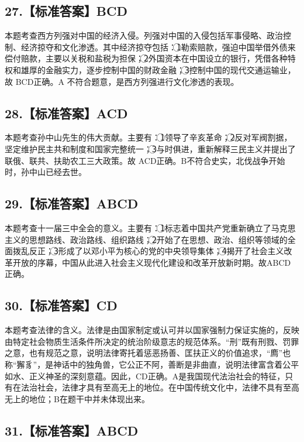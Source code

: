 \documentclass[UTF8,11pt]{ctexart}
\begin{document}
\subsection*{27.【标准答案】BCD}

本题考查西方列强对中国的经济入侵。列强对中国的入侵包括军事侵略、政治控制、经济掠夺和文化渗透。其中经济掠夺包括：\textcircled{1}勒索赔款，强迫中国举借外债来偿付赔款，主要以关税和盐税为担保；\textcircled{2}外国资本在中国设立的银行，凭借各种特权和雄厚的金融实力，逐步控制中国的财政金融；\textcircled{3}控制中国的现代交通运输业，故 BCD正确。A 不符合题意，是西方列强进行文化渗透的表现。


\subsection*{28.【标准答案】ACD}

本题考查孙中山先生的伟大贡献。主要有：\textcircled{1}领导了辛亥革命；\textcircled{2}反对军阀割据，坚定维护民主共和制度和国家完整统一；\textcircled{3}与时俱进，重新解释三民主义并提出了联俄、联共、扶助农工三大政策。故 ACD正确。B不符合史实，北伐战争开始时，孙中山已经去世。


\subsection*{29.【标准答案】ABCD}

本题考查十一届三中全会的意义。主要有：\textcircled{1}标志着中国共产党重新确立了马克思主义的思想路线、政治路线、组织路线；\textcircled{2}开始了在思想、政治、组织等领域的全面拨乱反正；\textcircled{3}形成了以邓小平为核心的党的中央领导集体；\textcircled{4}揭开了社会主义改革开放的序幕，中国从此进入社会主义现代化建设和改革开放新时期。故ABCD 正确。


\subsection*{30.【标准答案】CD}

本题考查法律的含义。法律是由国家制定或认可并以国家强制力保证实施的，反映由特定社会物质生活条件所决定的统治阶级意志的规范体系。“刑”既有刑戮、罚罪之意，也有规范之意，说明法律寄托着惩恶扬善、匡扶正义的价值追求，“廌”也称“獬豸”，是神话中的独角兽，它公正不阿，善断是非曲直，说明法律富含着公平如水、正义神圣的深刻意蕴。因此，CD正确。A是我国现代法治社会的特征，只有在法治社会，法律才具有至高无上的地位。在中国传统文化中，法律不具有至高无上的地位；B在题干中并未体现出来。


\subsection*{31.【标准答案】ABCD}
\end{document}
